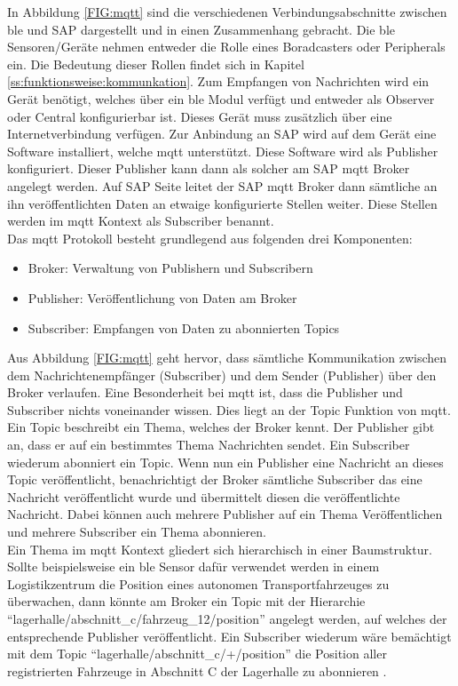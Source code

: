 \noindent In Abbildung \ref{FIG:mqtt} sind die verschiedenen Verbindungsabschnitte zwischen \ac{ble} und SAP dargestellt und in einen Zusammenhang gebracht. Die \ac{ble} Sensoren/Geräte nehmen entweder die Rolle eines Boradcasters oder Peripherals ein. Die Bedeutung dieser Rollen findet sich in Kapitel \ref{ss:funktionsweise:kommunkation}. Zum Empfangen von Nachrichten wird ein Gerät benötigt, welches über ein \ac{ble} Modul verfügt und entweder als Observer oder Central konfigurierbar ist. Dieses Gerät muss zusätzlich über eine Internetverbindung verfügen. Zur Anbindung an SAP wird auf dem Gerät eine Software installiert, welche \ac{mqtt} unterstützt. Diese Software wird als Publisher konfiguriert. Dieser Publisher kann dann als solcher am SAP \ac{mqtt} Broker angelegt werden. Auf SAP Seite leitet der SAP \ac{mqtt} Broker dann sämtliche an ihn veröffentlichten Daten an etwaige konfigurierte Stellen weiter. Diese Stellen werden im \ac{mqtt} Kontext als Subscriber benannt.\\

\noindent Das \ac{mqtt} Protokoll besteht grundlegend aus folgenden drei Komponenten:
\begin{itemize}
	\item{Broker: Verwaltung von Publishern und Subscribern}
	\item{Publisher: Veröffentlichung von Daten am Broker}
	\item{Subscriber: Empfangen von Daten zu abonnierten Topics}
\end{itemize}
Aus Abbildung \ref{FIG:mqtt} geht hervor, dass sämtliche Kommunikation zwischen dem Nachrichtenempfänger (Subscriber) und dem Sender (Publisher) über den Broker verlaufen. Eine Besonderheit bei \ac{mqtt} ist, dass die Publisher und Subscriber nichts voneinander wissen. Dies liegt an der Topic Funktion von \ac{mqtt}. Ein Topic beschreibt ein Thema, welches der Broker kennt. Der Publisher gibt an, dass er auf ein bestimmtes Thema Nachrichten sendet. Ein Subscriber wiederum abonniert ein Topic. Wenn nun ein Publisher eine Nachricht an dieses Topic veröffentlicht, benachrichtigt der Broker sämtliche Subscriber das eine Nachricht veröffentlicht wurde und übermittelt diesen die veröffentlichte Nachricht. Dabei können auch mehrere Publisher auf ein Thema Veröffentlichen und mehrere Subscriber ein Thema abonnieren.\\

\noindent Ein Thema im \ac{mqtt} Kontext gliedert sich hierarchisch in einer Baumstruktur. Sollte beispielsweise ein \ac{ble} Sensor dafür verwendet werden in einem Logistikzentrum die Position eines autonomen Transportfahrzeuges zu überwachen, dann könnte am Broker ein Topic mit der Hierarchie "`lagerhalle/abschnitt\_c/fahrzeug\_12/position"' angelegt werden, auf welches der entsprechende Publisher veröffentlicht. Ein Subscriber wiederum wäre bemächtigt mit dem Topic "`lagerhalle/abschnitt\_c/+/position"' die Position aller registrierten Fahrzeuge in Abschnitt C der Lagerhalle zu abonnieren \cite{MQTT19:WWW}.\\

